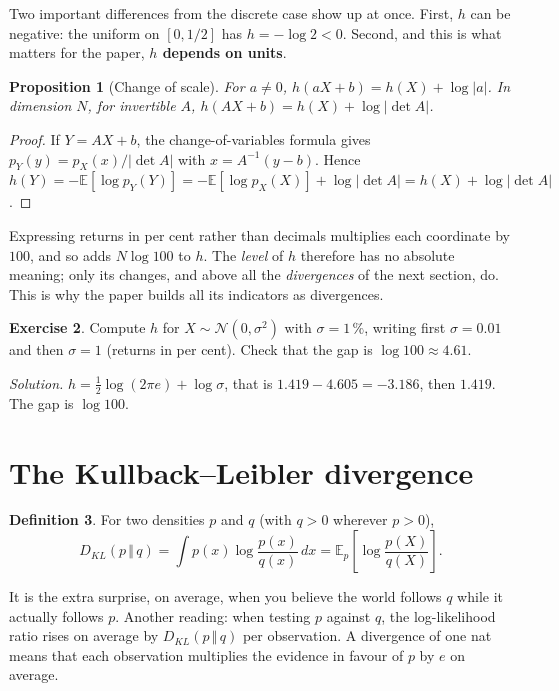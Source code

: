 \documentclass[11pt]{article}
\theoremstyle{plain}
\newtheorem{proposition}{Proposition}[section]
\theoremstyle{definition}
\newtheorem{definition}[proposition]{Definition}
\newtheorem{exercice}[proposition]{Exercise}
\theoremstyle{remark}
\newcommand{\E}{\mathbb{E}}
\newcommand{\N}{\mathcal{N}}
\newcommand{\KL}[2]{D_{KL}\!\left(#1\,\Vert\,#2\right)}
\begin{document}
Two important differences from the discrete case show up at once. First, $h$
can be negative: the uniform on $[0,1/2]$ has $h=-\log2<0$. Second, and this
is what matters for the paper, \textbf{$h$ depends on units}.

\begin{proposition}[Change of scale]
\label{prop:echelle}
For $a\neq0$, $h(aX+b)=h(X)+\log|a|$. In dimension $N$, for invertible $A$,
$h(AX+b)=h(X)+\log|\det A|$.
\end{proposition}

\begin{proof}
If $Y=AX+b$, the change-of-variables formula gives
$p_Y(y)=p_X(x)/|\det A|$ with $x=A^{-1}(y-b)$. Hence
$h(Y)=-\E[\log p_Y(Y)]=-\E[\log p_X(X)]+\log|\det A|=h(X)+\log|\det A|$.
\end{proof}

\begin{piege}
Expressing returns in per cent rather than decimals multiplies each coordinate
by $100$, and so adds $N\log100$ to $h$. The \emph{level} of $h$ therefore has
no absolute meaning; only its changes, and above all the \emph{divergences} of
the next section, do. This is why the paper builds all its indicators as
divergences.
\end{piege}

\begin{exercice}
Compute $h$ for $X\sim\N(0,\sigma^2)$ with $\sigma=1\,\%$, writing first
$\sigma=0.01$ and then $\sigma=1$ (returns in per cent). Check that the gap is
$\log100\approx4.61$.
\end{exercice}
\noindent\emph{Solution.} $h=\tfrac12\log(2\pi e)+\log\sigma$, that is
$1.419-4.605=-3.186$, then $1.419$. The gap is $\log 100$.

\section{The Kullback--Leibler divergence}
\label{sec:kl}

\begin{definition}
For two densities $p$ and $q$ (with $q>0$ wherever $p>0$),
\[
\KL{p}{q}=\int p(x)\log\frac{p(x)}{q(x)}\,dx=\E_p\!\left[\log\frac{p(X)}{q(X)}\right].
\]
\end{definition}

\begin{intuition}
It is the extra surprise, on average, when you believe the world follows $q$
while it actually follows $p$. Another reading: when testing $p$ against $q$,
the log-likelihood ratio rises on average by $\KL{p}{q}$ per observation. A
divergence of one nat means that each observation multiplies the evidence in
favour of $p$ by $e$ on average.
\end{intuition}
\end{document}
